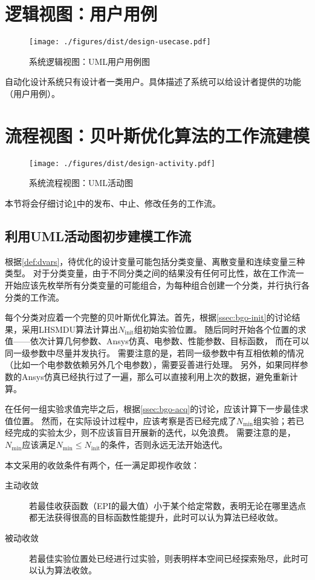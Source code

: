 \documentclass[index]{subfiles}
\begin{document}
\section{逻辑视图：用户用例}\label{sec:design-usecase}
\begin{figure}[h]
  \centering
  \texttt{[image: ./figures/dist/design-usecase.pdf]}
  \caption{系统逻辑视图：UML用户用例图\label{fig:design-usecase}}
\end{figure}
自动化设计系统只有设计者一类用户。具体描述了系统可以给设计者提供的功能（用户用例）。

\section{流程视图：贝叶斯优化算法的工作流建模}\label{sec:design-wf}
\begin{figure}[h]
  \centering
  \texttt{[image: ./figures/dist/design-activity.pdf]}
  \caption{系统流程视图：UML活动图\label{fig:design-activity}}
\end{figure}
本节将会仔细讨论\cref{fig:design-usecase}中的发布、中止、修改任务的工作流。

\subsection{利用UML活动图初步建模工作流}
根据\cref{def:dvars}，待优化的设计变量可能包括分类变量、离散变量和连续变量三种类型。
对于分类变量，由于不同分类之间的结果没有任何可比性，故在工作流一开始应该先枚举所有分类变量的可能组合，为每种组合创建一个分类，并行执行各分类的工作流。

每个分类对应着一个完整的贝叶斯优化算法。首先，根据\cref{ssec:bgo-init}的讨论结果，采用LHSMDU算法计算出$N_\mathrm{init}$组初始实验位置。
随后同时开始各个位置的求值——依次计算几何参数、Ansys仿真、电参数、性能参数、目标函数，
而在可以同一级参数中尽量并发执行。
需要注意的是，若同一级参数中有互相依赖的情况（比如一个电参数依赖另外几个电参数），需要妥善进行处理。
另外，如果同样参数的Ansys仿真已经执行过了一遍，那么可以直接利用上次的数据，避免重新计算。

在任何一组实验求值完毕之后，根据\cref{ssec:bgo-acq}的讨论，应该计算下一步最佳求值位置。
然而，在实际设计过程中，应该考察是否已经完成了$N_\mathrm{min}$组实验；若已经完成的实验太少，则不应该盲目开展新的迭代，以免浪费。
需要注意的是，$N_\mathrm{min}$应该满足$N_\mathrm{min} \leq N_\mathrm{init}$的条件，否则永远无法开始迭代。

本文采用的收敛条件有两个，任一满足即视作收敛：
\begin{description}
  \item[主动收敛] 若最佳收获函数（EPI的最大值）小于某个给定常数，表明无论在哪里选点都无法获得很高的目标函数性能提升，此时可以认为算法已经收敛。
  \item[被动收敛] 若最佳实验位置处已经进行过实验，则表明样本空间已经探索殆尽，此时可以认为算法收敛。
\end{description}
\end{document}
